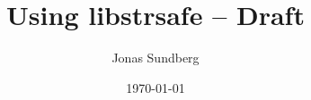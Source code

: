 \documentclass[a4paper,11pt,titlepage,draft]{article}
\title{Using libstrsafe -- Draft}
\date{\today}
\author{Jonas Sundberg}
\begin{document}
\maketitle

\begin{abstract}

\end{abstract}

\tableofcontents
\clearpage




\end{document}
